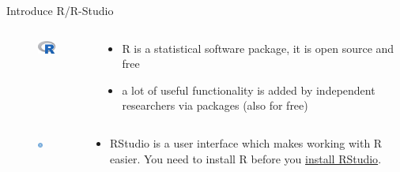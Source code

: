 \documentclass[
  ignorenonframetext,
]{beamer}
\begin{document}
\begin{frame}{Introduce R/R-Studio}
\protect\hypertarget{introduce-rr-studio}{}
\begin{columns}
  
  \begin{column}{0.2\textwidth}
    \begin{figure}
        \centering
        \includegraphics[width=2cm]{Rimage.jpeg}\\
    \end{figure}

  \end{column}
  \begin{column}{0.8\textwidth}
    \begin{itemize}
      \item R is a statistical software package, it is open source and free 
      \item a lot of useful functionality is added by independent researchers via packages (also for free)
    \end{itemize}
  \end{column}
    
\end{columns}

\begin{columns}
  
  \begin{column}{0.2\textwidth}
    \begin{figure}
        \centering
        \includegraphics[width=2cm]{RStudio_image.png}\\
    \end{figure}

  \end{column}
  \begin{column}{0.8\textwidth}
    \begin{itemize}
      \item RStudio is a user interface which makes working with R easier. You need to install R before you \href{https://youtu.be/EHjakj38Nnw}{install RStudio}. 
    \end{itemize}
    

\end{column}
\end{columns}
\end{frame}
\end{document}
